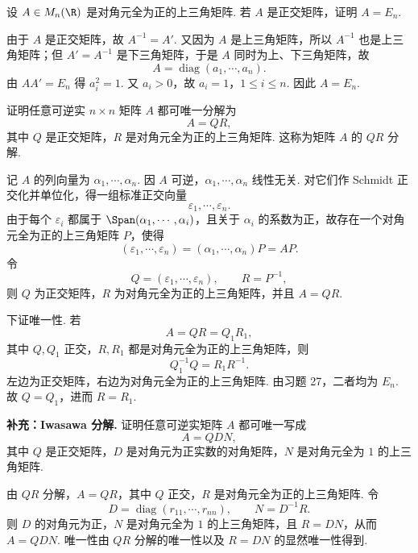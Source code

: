 \begin{problem}
	设 $A\in M_n(\R)$ 是对角元全为正的上三角矩阵. 若 $A$ 是正交矩阵，证明 $A=E_n$.
\end{problem}
\begin{solution}
	由于 $A$ 是正交矩阵，故 $A^{-1}=A'$. 又因为 $A$ 是上三角矩阵，所以 $A^{-1}$ 也是上三角矩阵；但 $A'=A^{-1}$ 是下三角矩阵，于是 $A$ 同时为上、下三角矩阵，故
	\[
	A=\operatorname{diag}(a_1,\cdots,a_n).
	\]
	由 $AA'=E_n$ 得 $a_i^2=1$. 又 $a_i>0$，故 $a_i=1$，$1\leqslant i\leqslant n$. 因此 $A=E_n$.
\end{solution}

\begin{problem}
	证明任意可逆实 $n\times n$ 矩阵 $A$ 都可唯一分解为
	\[
	A=QR,
	\]
	其中 $Q$ 是正交矩阵，$R$ 是对角元全为正的上三角矩阵. 这称为矩阵 $A$ 的 $QR$ 分解.
\end{problem}
\begin{solution}
	记 $A$ 的列向量为 $\alpha_1,\cdots,\alpha_n$. 因 $A$ 可逆，$\alpha_1,\cdots,\alpha_n$ 线性无关. 对它们作 Schmidt 正交化并单位化，得一组标准正交向量
	\[
	\varepsilon_1,\cdots,\varepsilon_n.
	\]
	由于每个 $\varepsilon_i$ 都属于 $\Span(\alpha_1,\cdots,\alpha_i)$，且关于 $\alpha_i$ 的系数为正，故存在一个对角元全为正的上三角矩阵 $P$，使得
	\[
	(\varepsilon_1,\cdots,\varepsilon_n)=(\alpha_1,\cdots,\alpha_n)P=AP.
	\]
	令
	\[
	Q=(\varepsilon_1,\cdots,\varepsilon_n),
	\qquad R=P^{-1},
	\]
	则 $Q$ 为正交矩阵，$R$ 为对角元全为正的上三角矩阵，并且 $A=QR$.
	
	下证唯一性. 若
	\[
	A=QR=Q_1R_1,
	\]
	其中 $Q,Q_1$ 正交，$R,R_1$ 都是对角元全为正的上三角矩阵，则
	\[
	Q_1^{-1}Q=R_1R^{-1}.
	\]
	左边为正交矩阵，右边为对角元全为正的上三角矩阵. 由习题 27，二者均为 $E_n$. 故 $Q=Q_1$，进而 $R=R_1$.
\end{solution}

\begin{problem}
	\textbf{补充：Iwasawa 分解.}
	证明任意可逆实矩阵 $A$ 都可唯一写成
	\[
	A=QDN,
	\]
	其中 $Q$ 是正交矩阵，$D$ 是对角元为正实数的对角矩阵，$N$ 是对角元全为 $1$ 的上三角矩阵.
\end{problem}
\begin{solution}
	由 $QR$ 分解，$A=QR$，其中 $Q$ 正交，$R$ 是对角元全为正的上三角矩阵. 令
	\[
	D=\operatorname{diag}(r_{11},\cdots,r_{nn}),
	\qquad N=D^{-1}R.
	\]
	则 $D$ 的对角元为正，$N$ 是对角元全为 $1$ 的上三角矩阵，且 $R=DN$，从而 $A=QDN$.
	唯一性由 $QR$ 分解的唯一性以及 $R=DN$ 的显然唯一性得到.
\end{solution}

